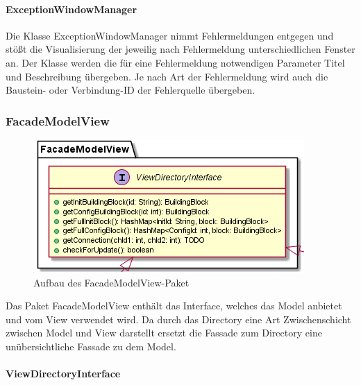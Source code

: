 \documentclass[parskip=full]{scrartcl}
\begin{document}
\paragraph{ExceptionWindowManager}

Die Klasse ExceptionWindowManager nimmt Fehlermeldungen entgegen und stößt die Visualisierung der jeweilig nach Fehlermeldung unterschiedlichen Fenster an. Der Klasse werden die für eine Fehlermeldung notwendigen Parameter Titel und  Beschreibung übergeben. Je nach Art der Fehlermeldung wird auch die Baustein- oder Verbindung-ID der Fehlerquelle übergeben.

\subsubsection {FacadeModelView}

\begin{figure}[htbp]
	\begin{center}
		\includegraphics[width = 12 cm]{Grafiken/View/FacadeModelViewNamespace.png}
		\caption{Aufbau des FacadeModelView-Paket}
		\label{Entwurf_Grob}
	\end{center}
\end{figure}

Das Paket FacadeModelView enthält das Interface, welches das Model anbietet und vom View verwendet wird. Da durch das Directory eine Art Zwischenschicht zwischen Model und View darstellt ersetzt die Fassade zum Directory eine unübersichtliche Fassade zu dem Model. 

\paragraph{ViewDirectoryInterface}
\end{document}
